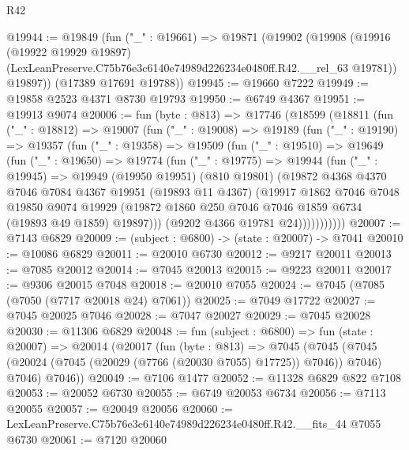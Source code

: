 \begin{lexlean}{R42}
\begin{coremodule}
{@19944 := @19849
    (fun ("_" : @19661) =>
    @19871
      (@19902
        (@19908
          (@19916
            (@19922 @19929 @19897)
            (LexLeanPreserve.C75b76e3c6140e74989d226234e0480ff.R42.__rel_63 @19781))
          @19897))
      (@17389 @17691 @19788))
@19945 := @19660 @7222
@19949 := @19858 @2523 @4371 @8730 @19793
@19950 := @6749 @4367
@19951 := @19913 @9074
@20006 := fun (byte : @813) =>
  @17746
    (@18599
      (@18811
        (fun ("_" : @18812) =>
        @19007
          (fun ("_" : @19008) =>
          @19189
            (fun ("_" : @19190) =>
            @19357
              (fun ("_" : @19358) =>
              @19509
                (fun ("_" : @19510) =>
                @19649
                  (fun ("_" : @19650) =>
                  @19774
                    (fun ("_" : @19775) =>
                    @19944
                      (fun ("_" : @19945) =>
                      @19949
                        (@19950 @19951)
                        (@810 @19801)
                        (@19872
                          @4368
                          @4370
                          @7046
                          @7084
                          @4367
                          @19951
                          (@19893 @11 @4367)
                          (@19917
                            @1862
                            @7046
                            @7048
                            @19850
                            @9074
                            @19929
                            (@19872 @1860 @250 @7046 @7046 @1859 @6734 (@19893 @49 @1859) @19897)))
                        (@9202 @4366 @19781 @24)))))))))))
@20007 := @7143 @6829
@20009 := (subject : @6800) -> (state : @20007) -> @7041
@20010 := @10086 @6829
@20011 := @20010 @6730
@20012 := @9217 @20011
@20013 := @7085 @20012
@20014 := @7045 @20013
@20015 := @9223 @20011
@20017 := @9306 @20015 @7048
@20018 := @20010 @7055
@20024 := @7045 (@7085 (@7050 (@7717 @20018 @24) @7061))
@20025 := @7049 @17722
@20027 := @7045 @20025 @7046
@20028 := @7047 @20027
@20029 := @7045 @20028
@20030 := @11306 @6829
@20048 := fun (subject : @6800) =>
  fun (state : @20007) =>
  @20014
    (@20017
      (fun (byte : @813) =>
      @7045
        (@7045 (@7045 (@20024 (@7045 (@20029 (@7766 (@20030 @7055) @17725)) @7046)) @7046) @7046)
        @7046))
@20049 := @7106 @1477
@20052 := @11328 @6829 @822 @7108
@20053 := @20052 @6730
@20055 := @6749 @20053 @6734
@20056 := @7113 @20055
@20057 := @20049 @20056
@20060 := LexLeanPreserve.C75b76e3c6140e74989d226234e0480ff.R42.__fits_44 @7055 @6730
@20061 := @7120 @20060
}
\end{coremodule}
\end{lexlean}
